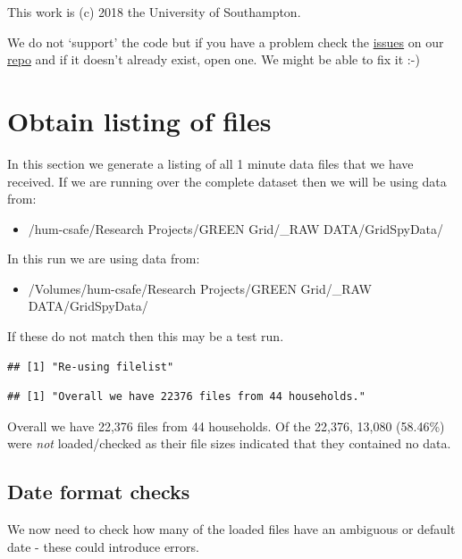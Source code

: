 \documentclass[]{article}
\providecommand{\tightlist}{%
  \setlength{\itemsep}{0pt}\setlength{\parskip}{0pt}}
\begin{document}
This work is (c) 2018 the University of Southampton.

We do not `support' the code but if you have a problem check the
\href{https://git.soton.ac.uk/ba1e12/nzGREENGrid/issues}{issues} on our
\href{https://git.soton.ac.uk/ba1e12/nzGREENGrid}{repo} and if it
doesn't already exist, open one. We might be able to fix it :-)

\section{Obtain listing of files}\label{obtain-listing-of-files}

In this section we generate a listing of all 1 minute data files that we
have received. If we are running over the complete dataset then we will
be using data from:

\begin{itemize}
\tightlist
\item
  /hum-csafe/Research Projects/GREEN Grid/\_RAW DATA/GridSpyData/
\end{itemize}

In this run we are using data from:

\begin{itemize}
\tightlist
\item
  /Volumes/hum-csafe/Research Projects/GREEN Grid/\_RAW
  DATA/GridSpyData/
\end{itemize}

If these do not match then this may be a test run.

\begin{verbatim}
## [1] "Re-using filelist"
\end{verbatim}

\begin{verbatim}
## [1] "Overall we have 22376 files from 44 households."
\end{verbatim}

Overall we have 22,376 files from 44 households. Of the 22,376, 13,080
(58.46\%) were \emph{not} loaded/checked as their file sizes indicated
that they contained no data.

\subsection{Date format checks}\label{date-format-checks}

We now need to check how many of the loaded files have an ambiguous or
default date - these could introduce errors.
\end{document}
